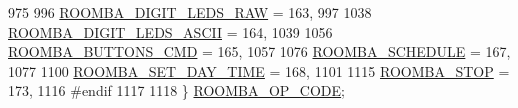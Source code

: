 \begin{DoxyCode}
975 
996   \hyperlink{group__roomba-lib_gga305e17dfb7050ad83ea49ded2e6a2e24acd27e02da97cb9cc482177a27e135c45}{ROOMBA\_DIGIT\_LEDS\_RAW} = 163,
997 
1038   \hyperlink{group__roomba-lib_gga305e17dfb7050ad83ea49ded2e6a2e24a094d22b24aae1379b33389cf701b5356}{ROOMBA\_DIGIT\_LEDS\_ASCII} = 164,
1039 
1056   \hyperlink{group__roomba-lib_gga305e17dfb7050ad83ea49ded2e6a2e24ab369d673cdfb4414fb307ddaef5288dd}{ROOMBA\_BUTTONS\_CMD} = 165,
1057 
1076   \hyperlink{group__roomba-lib_gga305e17dfb7050ad83ea49ded2e6a2e24ac4b9ca54bc982f8b9b565c72cb642ccc}{ROOMBA\_SCHEDULE} = 167,
1077 
1100   \hyperlink{group__roomba-lib_gga305e17dfb7050ad83ea49ded2e6a2e24a17519d3bc7b9e8c70af28afe85d92229}{ROOMBA\_SET\_DAY\_TIME} = 168,
1101 
1115   \hyperlink{group__roomba-lib_gga305e17dfb7050ad83ea49ded2e6a2e24a4c60272718e8bd851c58e6a9545f0d9f}{ROOMBA\_STOP} = 173,
1116 \textcolor{preprocessor}{  #endif}
1117 
1118 \} \hyperlink{group__roomba-lib_gaa48d04e007e0ae60ee9bc055a5a159fe}{ROOMBA\_OP\_CODE};
\end{DoxyCode}
